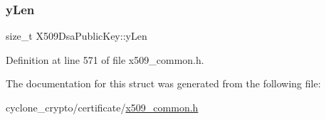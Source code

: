 \mbox{\label{structX509DsaPublicKey_ae8ad5e10e6090c0b95a083b49efe18b2}} 
\subsubsection{\texorpdfstring{y\+Len}{yLen}}
{\footnotesize\ttfamily size\+\_\+t X509\+Dsa\+Public\+Key\+::y\+Len}



Definition at line 571 of file x509\+\_\+common.\+h.



The documentation for this struct was generated from the following file\+:\begin{DoxyCompactItemize}
\item 
cyclone\+\_\+crypto/certificate/\hyperlink{certificate_2x509__common_8h}{x509\+\_\+common.\+h}\end{DoxyCompactItemize}
